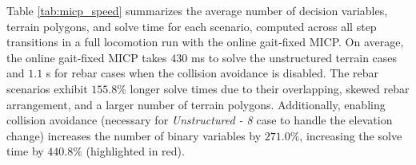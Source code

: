 Table \ref{tab:micp_speed} summarizes the average number of decision variables, terrain polygons, and solve time for each scenario, computed across all step transitions in a full locomotion run with the online gait-fixed MICP.
On average, the online gait-fixed MICP takes $430$ ms to solve the unstructured terrain cases and $1.1$ s for rebar cases when the collision avoidance is disabled. 
The rebar scenarios exhibit $155.8\%$ longer solve times due to their overlapping, skewed rebar arrangement, and a larger number of terrain polygons. 
Additionally, 
enabling 
collision avoidance (necessary for \textit{Unstructured - 8} case to handle the elevation change) 
increases the number of binary variables
by $271.0\%$, 
increasing the solve time 
by $440.8\%$
(highlighted in red).

